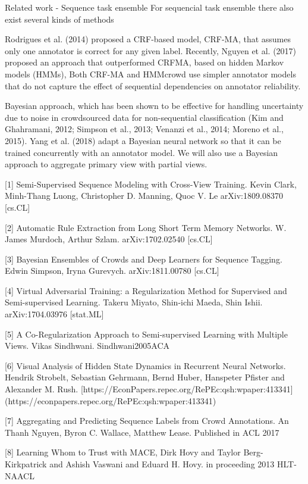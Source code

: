 \documentclass{article}
\begin{document}
Related work - Sequence task ensemble
For sequencial task ensemble there also exist several kinds of methods

Rodrigues et al. (2014) proposed a CRF-based model, CRF-MA, that assumes only one annotator is correct for any given label.
Recently, Nguyen et al. (2017) proposed an approach that outperformed CRFMA, based on hidden Markov models (HMMs),
Both CRF-MA and HMMcrowd use simpler annotator models that do not capture the effect of sequential dependencies on annotator reliability.

Bayesian approach, which has been shown to be effective for handling uncertainty due to noise in crowdsourced data for non-sequential classification (Kim and Ghahramani, 2012; Simpson et al., 2013; Venanzi et al., 2014; Moreno et al., 2015).
Yang et al. (2018) adapt a Bayesian neural network so that it can be trained concurrently with an annotator model.
We will also use a Bayesian approach to aggregate primary view with partial views.

[1] Semi-Supervised Sequence Modeling with Cross-View Training. Kevin Clark, Minh-Thang Luong, Christopher D. Manning, Quoc V. Le arXiv:1809.08370 [cs.CL]

[2] Automatic Rule Extraction from Long Short Term Memory Networks. W. James Murdoch, Arthur Szlam. arXiv:1702.02540 [cs.CL]

[3] Bayesian Ensembles of Crowds and Deep Learners for Sequence Tagging. Edwin Simpson, Iryna Gurevych. arXiv:1811.00780 [cs.CL]

[4] Virtual Adversarial Training: a Regularization Method for Supervised and Semi-supervised Learning. Takeru Miyato, Shin-ichi Maeda, Shin Ishii. arXiv:1704.03976 [stat.ML]

[5] A Co-Regularization Approach to Semi-supervised Learning with Multiple Views. Vikas Sindhwani. Sindhwani2005ACA

[6] Visual Analysis of Hidden State Dynamics in Recurrent Neural Networks. Hendrik Strobelt, Sebastian Gehrmann, Bernd Huber, Hanspeter Pfister and Alexander M. Rush.
[https://EconPapers.repec.org/RePEc:qsh:wpaper:413341]
(https://econpapers.repec.org/RePEc:qsh:wpaper:413341)

 [7] Aggregating and Predicting Sequence Labels from Crowd Annotations. An Thanh Nguyen, Byron C. Wallace, Matthew Lease. Published in ACL 2017

[8] Learning Whom to Trust with MACE, Dirk Hovy and Taylor Berg-Kirkpatrick and Ashish Vaswani and Eduard H. Hovy. in proceeding 2013 HLT-NAACL
\end{document}
